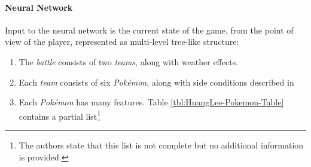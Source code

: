 \paragraph{Neural Network}
Input to the neural network is the current state of the game, from the point of view of the player,
represented as multi-level tree-like structure:
\begin{enumerate}
    \item The \textit{battle} consists of two \textit{teams}, along with weather effects.
    \item Each \textit{team} consists of six \textit{Pokémon}, along with side conditions 
    described in 
    \item Each \textit{Pokémon} has many features. Table \ref{tbl:HuangLee-Pokemon-Table} contains a partial 
    list\footnote{The authors state that this list is not complete but no additional information is provided.}
\end{enumerate}
